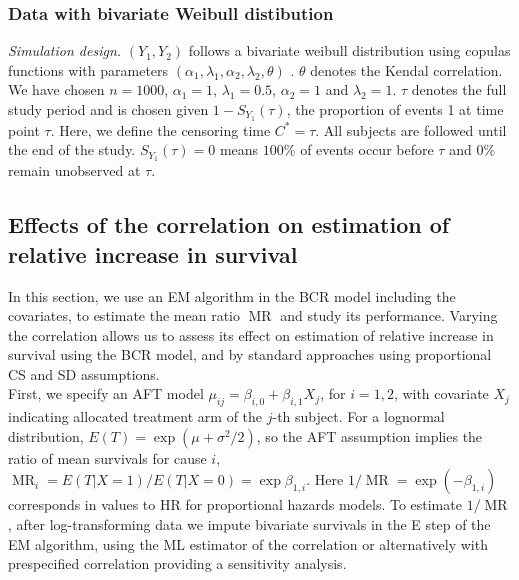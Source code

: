 \documentclass[twoside,a4paper,12pt]{article}
\def\MR{\operatorname{MR}}
\theoremstyle{plain}
\theoremstyle{definition}
\begin{document}
 \subsubsection{Data with bivariate Weibull distibution}
\noindent \textit{Simulation design.} $(Y_1,Y_2)$ follows a bivariate weibull 
distribution using copulas functions with parameters 
$(\alpha_{1},\lambda_{1},\alpha_{2},\lambda_{2},\theta)$ \citep{Escarela2003}. 
$\theta$ denotes the Kendal correlation.
We have chosen $n=1000$, $\alpha_1=1$, $\lambda_1=0.5$, $\alpha_{2}=1$ and 
$\lambda_2=1$. 
$\tau$ denotes the full study period and is chosen given $1-S_{Y_1}(\tau)$, the 
proportion of events 1 at time point $\tau$. 
Here, we define the censoring time $C^*=\tau$. 
All subjects are followed until the end of the study. 
$S_{Y_1}(\tau)=0$ means $100\%$ of events occur before $\tau$ and $0\%$ remain 
unobserved at $\tau$.  
\\

\subsection{Effects of the correlation on estimation of relative increase in survival}\label{simul2}

In this section, we use an EM algorithm in the BCR model including the 
covariates, to estimate the mean ratio $\MR$ and study its 
performance. 
Varying the correlation allows us to assess its effect on estimation of relative 
increase in survival using the BCR model, and
by standard approaches using proportional CS and SD 
{assumptions}.\\

First, we specify 
an AFT model $\mu_{ij}=\beta_{i,0}+\beta_{i,1}X_{j}$,  for $i=1,2$,
with covariate $X_j$ indicating allocated treatment arm of the $j$-th subject. %
For a lognormal distribution, $E(T)=\exp(\mu+\sigma^2/2) $, so the AFT assumption implies
the ratio of mean survivals for cause $i$,  $\MR_i = E(T|X=1)/ E(T|X=0) =\exp \beta_{1,i}$.
Here $1/\MR =\exp(-\beta_{1,i})$ corresponds in values to HR for proportional hazards models.
To estimate $1/\MR$, after log-transforming data 
we  impute bivariate survivals in the E step of the EM algorithm, 
using the ML estimator of the correlation or alternatively with  
prespecified correlation providing a sensitivity analysis. 
\\
\end{document}
